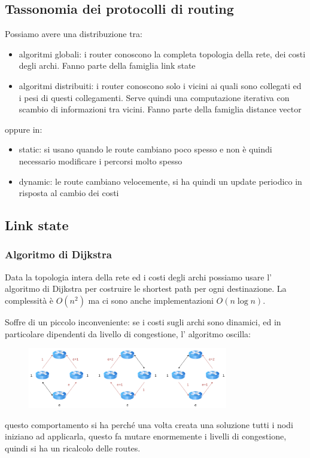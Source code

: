\subsection{Tassonomia dei protocolli di routing}
Possiamo avere una distribuzione tra:
\begin{itemize}
    \item algoritmi globali: i router conoscono la completa topologia della rete, dei costi degli archi.
    Fanno parte della famiglia link state
    
    \item algoritmi distribuiti: i router conoscono solo i vicini ai quali sono collegati ed i pesi di questi collegamenti.
    Serve quindi una computazione iterativa con scambio di informazioni tra vicini.
    Fanno parte della famiglia distance vector
\end{itemize}
oppure in:
\begin{itemize}
    \item static: si usano quando le route cambiano poco spesso e non è quindi necessario modificare i percorsi molto spesso
    
    \item dynamic: le route cambiano velocemente, si ha quindi un update periodico in risposta al cambio dei costi
\end{itemize}

\subsection{Link state}
\subsubsection{Algoritmo di Dijkstra}
Data la topologia intera della rete ed i costi degli archi possiamo usare l' algoritmo di Dijkstra per costruire le shortest path per ogni destinazione.
La complessità è $O(n^2)$ ma ci sono anche implementazioni $O(n\log{n})$.

Soffre di un piccolo inconveniente: se i costi sugli archi sono dinamici, ed in particolare dipendenti da livello di congestione, l' algoritmo oscilla:
\begin{figure}[H]
    \centering
    \includegraphics[width=330px]{images/5.1_Protocolli_di_routing/link_state_oscillation.png}
\end{figure}
questo comportamento si ha perché una volta creata una soluzione tutti i nodi iniziano ad applicarla, questo fa mutare enormemente i livelli di congestione, quindi si ha un ricalcolo delle routes.

